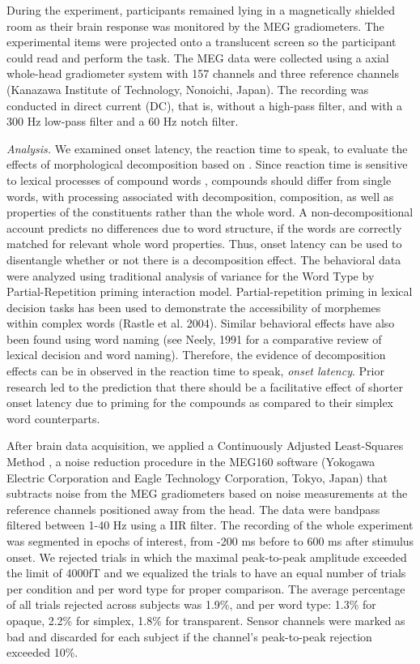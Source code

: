 \documentclass{frontiersSCNS}
\begin{document}
	During the experiment, participants remained lying in a magnetically shielded room as their brain response was monitored by the MEG gradiometers. The experimental items were projected onto a translucent screen so the participant could read and perform the task. The MEG data were collected using a axial whole-head gradiometer system with 157 channels and three reference channels (Kanazawa Institute of Technology, Nonoichi, Japan).  The recording was conducted in direct current (DC), that is, without a high-pass filter, and with a 300 Hz low-pass filter and a 60 Hz notch filter.

\textit{Analysis.} We examined onset latency, the reaction time to speak, to evaluate the effects of morphological decomposition based on \citep{Fiorentino:2007}. Since reaction time is sensitive to lexical processes of compound words \citep{Fiorentino:2007}, compounds should differ from single words, with processing associated with decomposition, composition, as well as properties of the constituents rather than the whole word. A non-decompositional account predicts no differences due to word structure, if the words are correctly matched for relevant whole word properties. Thus, onset latency can be used to disentangle whether or not there is a decomposition effect. The behavioral data were analyzed using traditional analysis of variance for the Word Type by Partial-Repetition priming interaction model.
Partial-repetition priming in lexical decision tasks has been used to demonstrate the accessibility of morphemes within complex words (Rastle et al. 2004). Similar behavioral effects have also been found using word naming (see Neely, 1991 for a comparative review of lexical decision and word naming). Therefore, the evidence of decomposition effects can be in observed in the reaction time to speak, \textit{onset latency}. Prior research led to the prediction that there should be a facilitative effect of shorter onset latency due to priming for the compounds as compared to their simplex word counterparts. 


After brain data acquisition, we applied a Continuously Adjusted Least-Squares Method \citep*{Adachi:2001}, a noise reduction procedure in the MEG160 software (Yokogawa Electric Corporation and Eagle Technology Corporation, Tokyo, Japan) that subtracts noise from the MEG gradiometers based on noise measurements at the reference channels positioned away from the head.  The data were bandpass filtered between 1-40 Hz using a IIR filter.  The recording of the whole experiment was segmented in epochs of interest, from -200 ms before to 600 ms after stimulus onset.  We rejected trials in which the maximal peak-to-peak amplitude exceeded the limit of 4000fT and we equalized the trials to have an equal number of trials per condition and per word type for proper comparison. The average percentage of all trials rejected across subjects was 1.9\%, and per word type: 1.3\% for opaque, 2.2\% for simplex, 1.8\% for transparent. Sensor channels were marked as bad and discarded for each subject if the channel’s peak-to-peak rejection exceeded 10\%. 
\end{document}
